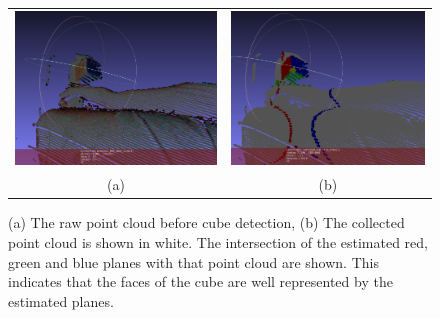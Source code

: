 \documentclass{llncs}
\begin{document}
\begin{figure}
\centering
\begin{tabular}{cc}
\centering
\includegraphics[scale=.233]{linesNotFound} &
\includegraphics[scale=.233]{linesPointCloud}\\
(a) & (b)
\end{tabular}

\caption{
(a) The raw point cloud before cube detection, (b) The collected point cloud is shown in white. The intersection of the estimated red, green and blue planes with that point cloud are shown. This indicates that the faces of the cube are well represented by the estimated planes.
}
\end{figure}
\end{document}
